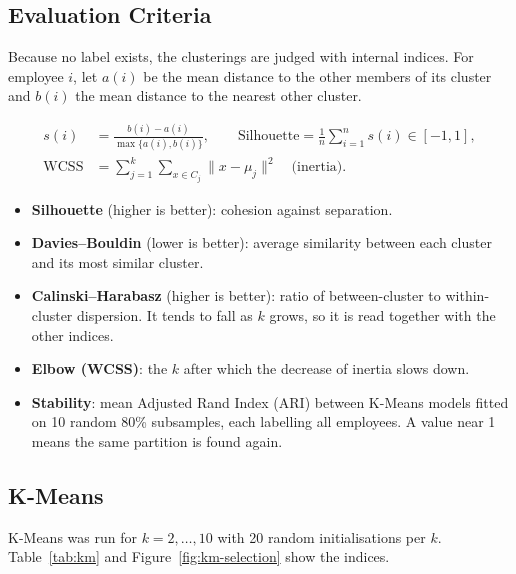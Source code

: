 \documentclass[12pt,a4paper]{article}
\begin{document}
\subsection{Evaluation Criteria}

Because no label exists, the clusterings are judged with internal indices.
For employee $i$, let $a(i)$ be the mean distance to the other members of its
cluster and $b(i)$ the mean distance to the nearest other cluster.

\begin{align}
  s(i) &= \frac{b(i) - a(i)}{\max\{a(i), b(i)\}}, \qquad
  \text{Silhouette} = \frac{1}{n}\sum_{i=1}^{n} s(i) \in [-1, 1],\\
  \text{WCSS} &= \sum_{j=1}^{k}\sum_{x \in C_j}\lVert x - \mu_j \rVert^2
  \quad\text{(inertia)}.
\end{align}

\begin{itemize}
  \item \textbf{Silhouette} (higher is better): cohesion against separation.
  \item \textbf{Davies--Bouldin} (lower is better): average similarity between
  each cluster and its most similar cluster.
  \item \textbf{Calinski--Harabasz} (higher is better): ratio of between-cluster
  to within-cluster dispersion. It tends to fall as $k$ grows, so it is read
  together with the other indices.
  \item \textbf{Elbow (WCSS)}: the $k$ after which the decrease of inertia
  slows down.
  \item \textbf{Stability}: mean Adjusted Rand Index (ARI) between K-Means
  models fitted on 10 random 80\% subsamples, each labelling all employees. A
  value near 1 means the same partition is found again.
\end{itemize}

\subsection{K-Means}

K-Means was run for $k = 2,\dots,10$ with 20 random initialisations per $k$.
Table~\ref{tab:km} and Figure~\ref{fig:km-selection} show the indices.
\end{document}
